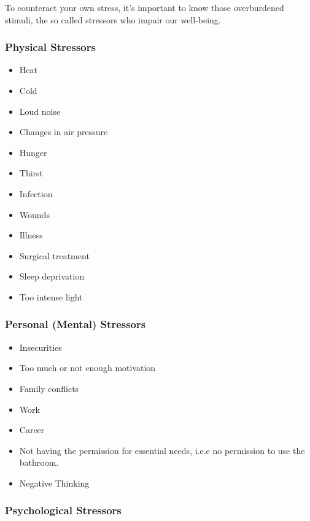 \documentclass[../Book.Stress_regulation.tex]{subfiles}
\begin{document}
To counteract your own stress, it's important to know those overburdened stimuli, the so called stressors who impair our well-being.

\subsubsection{Physical Stressors}
\begin{itemize}
\item Heat
\item Cold
\item Loud noise
\item Changes in air pressure
\item Hunger
\item Thirst
\item Infection
\item Wounds
\item Illness
\item Surgical treatment
\item Sleep deprivation
  \item Too intense light
  \end{itemize}

  \subsubsection{Personal (Mental) Stressors}

  \begin{itemize}
  \item Insecurities
  \item Too much or not enough motivation
  \item Family conflicts
  \item Work
  \item Career
  \item Not having the permission for essential needs, i.e.e no permission to use the bathroom.
    \item Negative Thinking 
  \end{itemize}
\subsubsection{Psychological Stressors}
\end{document}
